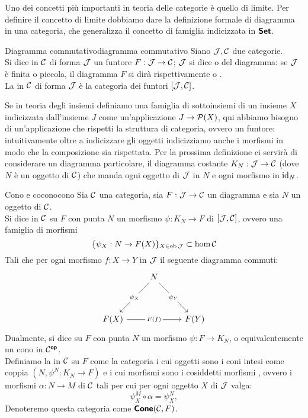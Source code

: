 \documentclass{article}
\renewcommand\C{\mc{C}}
\newcommand\J{\mc{J}}
\begin{document}
Uno dei concetti più importanti in teoria delle categorie è quello di limite. Per definire il concetto di limite dobbiamo dare la definizione formale di diagramma in una categoria, che generalizza il concetto di famiglia indicizzata in $\text{\sffamily\textbf{Set}}$.

\begin{definition}{Diagramma commutativo}{diagramma commutativo}
    Siano $\J, \C$ due categorie.\\
    Si dice  in $\C$ di forma $\J$ un funtore $F:\J\to\C$; $\J$ si dice  o  del diagramma: se $\J$ è finita o piccola, il diagramma $F$ si dirà rispettivamente  o .\\
    La  in $\C$ di forma $\J$ è la categoria dei funtori $[\J,\C]$.
\end{definition}

Se in teoria degli insiemi definiamo una famiglia di sottoinsiemi di un insieme $X$ indicizzata dall'insieme $J$ come un'applicazione $J\to \mathcal{P}(X)$, qui abbiamo bisogno di un'applicazione che rispetti la struttura di categoria, ovvero un funtore: intuitivamente oltre a indicizzare gli oggetti indicizziamo anche i morfismi in modo che la composizione sia rispettata. Per la prossima definizione ci servirà di considerare un diagramma particolare, il diagramma costante $K_N : \J\to \C$ (dove $N$ è un oggetto di $\C$) che manda ogni oggetto di $\J$ in $N$ e ogni morfismo in $\operatorname{id}_N$.

\begin{definition}{Cono e cocono}{cono}
    Sia $\C$ una categoria, sia $F: \J\to\C$ un diagramma e sia $N$ un oggetto di $\C$.\\
    Si dice  in $\C$ su $F$ con punta $N$ un morfismo $\psi : K_N \to F$ di $[\J,\C]$, ovvero una famiglia di morfismi \[\{\psi_X : N\to F(X)\}_{X \in \ob\J} \subset \hom\C\]
    Tali che per ogni morfismo $f:X\to Y$ in $\J$ il seguente diagramma commuti:
    \[\begin{tikzcd}
    	& N \\
    	\\
    	{F(X)} && {F(Y)}
    	\arrow["{\psi_X}"{description}, from=1-2, to=3-1]
    	\arrow["{\psi_Y}"{description}, from=1-2, to=3-3]
	    \arrow["{F(f)}"{description}, from=3-1, to=3-3]
    \end{tikzcd}\]
    Dualmente, si dice  su $F$ con punta $N$ un morfismo $\psi : F \to K_N$, o equivalentemente un cono in $\C^\op$.\\
    Definiamo la  in $\C$ su $F$ come la categoria i cui oggetti sono i coni intesi come coppia $(N, \psi^N: K_N \to F )$ e i cui morfismi sono i cosiddetti morfismi , ovvero i morfismi $\alpha : N\to M$ di $\C$ tali per cui per ogni oggetto $X$ di $\J$ valga:
    \[\psi^M_X\circ \alpha = \psi^N_X,\]
    Denoteremo questa categoria come $\cone(\C,F)$.
\end{definition}
\end{document}
